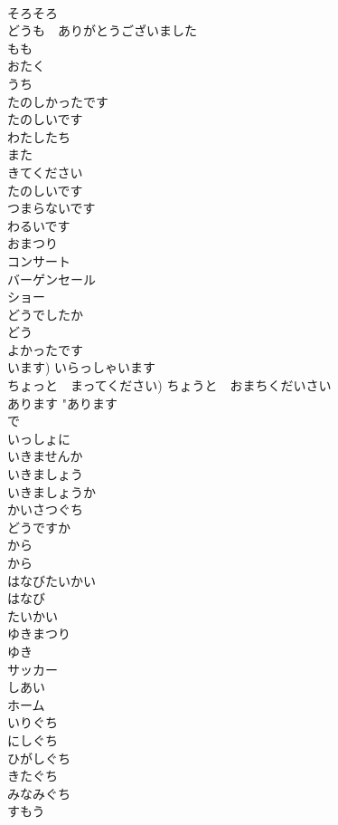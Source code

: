 \documentclass[8pt]{extreport}
\begin{document}
\begin{CJK}{UTF8}{min}
\\	そろそろ		
\\	どうも　ありがとうございました		
\\	もも		
\\	おたく	
\\	うち	
\\	たのしかったです		
\\	たのしいです		
\\	わたしたち		
\\	また		
\\	きてください		
\\	たのしいです		
\\	つまらないです		
\\	わるいです		
\\	おまつり		
\\	コンサート		
\\	バーゲンセール		
\\	ショー		
\\	どうでしたか		
\\	どう		
\\	よかったです		
\\	います)	いらっしゃいます		
\\	ちょっと　まってください)	ちょうと　おまちくだいさい		
\\	あります	"あります 
\\	で
\\	いっしょに		
\\	いきませんか		
\\	いきましょう		
\\	いきましょうか		
\\	かいさつぐち		
\\	どうですか		
\\	から	
\\	から 
\\	はなびたいかい		
\\	はなび		
\\	たいかい		
\\	ゆきまつり		
\\	ゆき		
\\	サッカー		
\\	しあい		
\\	ホーム		
\\	いりぐち		
\\	にしぐち		
\\	ひがしぐち		
\\	きたぐち		
\\	みなみぐち		
\\	すもう		

\end{CJK}
\end{document}
